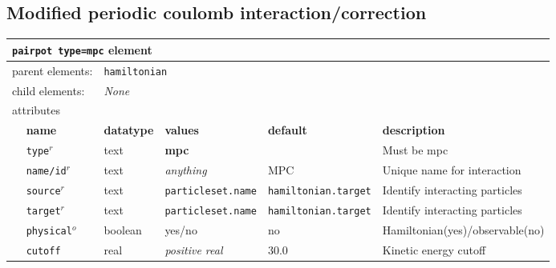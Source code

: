 \subsection{Modified periodic coulomb interaction/correction}

\FloatBarrier
\begin{table}[h]
\begin{center}
\begin{tabularx}{\textwidth}{l l l l l l }
\hline
\multicolumn{6}{l}{\texttt{pairpot type=mpc} element} \\
\hline
\multicolumn{2}{l}{parent elements:} & \multicolumn{4}{l}{\texttt{hamiltonian}}\\
\multicolumn{2}{l}{child  elements:} & \multicolumn{4}{l}{\textit{None}}\\
\multicolumn{2}{l}{attributes}  & \multicolumn{4}{l}{}\\
   &   \bfseries name     & \bfseries datatype & \bfseries values & \bfseries default   & \bfseries description \\
   & \texttt{type}$^r$    &  text              & \textbf{mpc}     &                     & Must be mpc         \\
   & \texttt{name/id}$^r$ &  text              & \textit{anything}&  MPC                & Unique name for interaction \\
   & \texttt{source}$^r$  &  text              & \texttt{particleset.name} &\texttt{hamiltonian.target}& Identify interacting particles\\
   & \texttt{target}$^r$  &  text              & \texttt{particleset.name} &\texttt{hamiltonian.target}& Identify interacting particles  \\
   & \texttt{physical}$^o$&  boolean           & yes/no           & no                  & Hamiltonian(yes)/observable(no) \\
   &  \texttt{cutoff}     &  real              & \textit{positive real}& 30.0           & Kinetic energy cutoff \\
  \hline
\end{tabularx}
\end{center}
\end{table}
